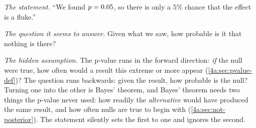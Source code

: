 \emph{The statement.} ``We found $p=0.05$, so there is only a $5\%$ chance that
the effect is a fluke.''

\emph{The question it seems to answer.} Given what we saw, how probable is it that
nothing is there?

\emph{The hidden assumption.} The p-value runs in the forward direction: \emph{if} the
null were true, how often would a result this extreme or more appear
(\cref{4a:sec:pvalue-def})? The question runs backwards: given the result, how probable
is the null? Turning one into the other is Bayes' theorem, and Bayes' theorem needs two
things the p-value never used: how readily the \emph{alternative} would have produced the
same result, and how often nulls are true to begin with
(\cref{4a:sec:not-posterior}). The statement silently sets the first to one and ignores
the second.

